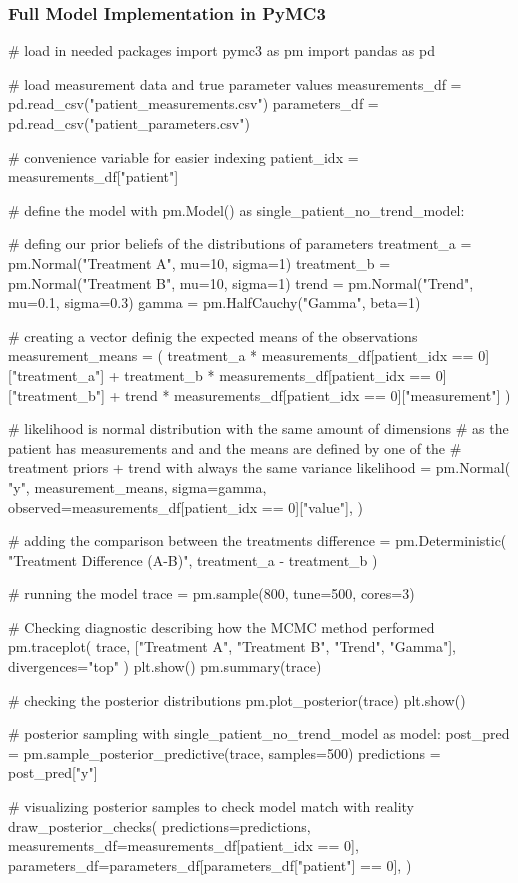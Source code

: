 \documentclass[12pt,a4paper,leqno]{report}
\theoremstyle{plain}
\theoremstyle{definition}
\theoremstyle{remark}
\begin{document}
\pagebreak

\subsubsection{Full Model Implementation in PyMC3}

\begin{pyverbatim}
# load in needed packages
import pymc3 as pm
import pandas as pd

# load measurement data and true parameter values
measurements_df = pd.read_csv("patient_measurements.csv")
parameters_df = pd.read_csv("patient_parameters.csv")

# convenience variable for easier indexing
patient_idx = measurements_df["patient"]
   
# define the model
with pm.Model() as single_patient_no_trend_model:

    # defing our prior beliefs of the distributions of parameters
    treatment_a = pm.Normal("Treatment A", mu=10, sigma=1)
    treatment_b = pm.Normal("Treatment B", mu=10, sigma=1)
    trend = pm.Normal("Trend", mu=0.1, sigma=0.3)
    gamma = pm.HalfCauchy("Gamma", beta=1)

    # creating a vector definig the expected means of the observations
    measurement_means = (
        treatment_a * measurements_df[patient_idx == 0]["treatment_a"]
        + treatment_b * measurements_df[patient_idx == 0]["treatment_b"]
        + trend * measurements_df[patient_idx == 0]["measurement"]
    )

    # likelihood is normal distribution with the same amount of dimensions
    # as the patient has measurements and and the means are defined by one of the
    # treatment priors + trend with always the same variance
    likelihood = pm.Normal(
        "y",
        measurement_means,
        sigma=gamma,
        observed=measurements_df[patient_idx == 0]["value"],
    )

    # adding the comparison between the treatments
    difference = pm.Deterministic(
        "Treatment Difference (A-B)", treatment_a - treatment_b
    )

    # running the model
    trace = pm.sample(800, tune=500, cores=3)

    # Checking diagnostic describing how the MCMC method performed
    pm.traceplot(
        trace, ["Treatment A", "Treatment B", "Trend", "Gamma"], divergences="top"
    )
    plt.show()
    pm.summary(trace)

    # checking the posterior distributions
    pm.plot_posterior(trace)
    plt.show()

 
# posterior sampling
with single_patient_no_trend_model as model:
    post_pred = pm.sample_posterior_predictive(trace, samples=500)
    predictions = post_pred["y"]

# visualizing posterior samples to check model match with reality
draw_posterior_checks(
    predictions=predictions,
    measurements_df=measurements_df[patient_idx == 0],
    parameters_df=parameters_df[parameters_df["patient"] == 0],
)
\end{pyverbatim}
\end{document}
